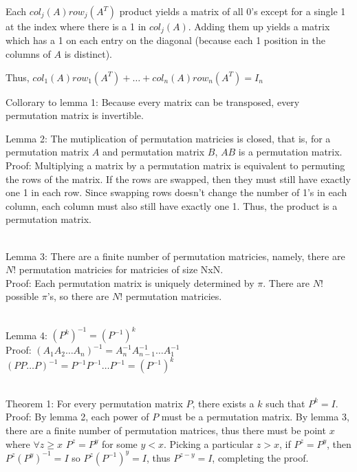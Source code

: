 \documentclass[11pt, oneside]{article}
\begin{document}
Each \( col_j(A) row_j(A^T) \) product yields a matrix of all 0's except
for a single 1 at the index where there is a 1 in \( col_j(A) \).
Adding them up yields a matrix which has a 1 on each entry on the diagonal (because each 1
position in the columns of \( A \) is distinct).

Thus, \( col_1(A) row_1(A^T) + \dots + col_n(A) row_n(A^T) = I_n \)

\noindent
Collorary to lemma 1: Because every matrix can be transposed,
every permutation matrix is invertible.

\newpage

\noindent
Lemma 2: The mutiplication of permutation matricies is closed,
that is, for a permutation matrix \( A \) and permutation matrix \( B \),
\( AB \) is a permutation matrix.
\\ Proof: Multiplying a matrix by a permutation matrix is equivalent to
permuting the rows of the matrix. If the rows are swapped, then they
must still have exactly one 1 in each row. Since swapping rows doesn't
change the number of 1's in each column, each column must also still
have exactly one 1. Thus, the product is a permutation matrix.

\noindent
\\ Lemma 3: There are a finite number of permutation matricies,
namely, there are \( N! \) permutation matricies for matricies of size NxN.
\\ Proof: Each permutation matrix is uniquely determined by \( \pi \).
There are \( N! \) possible \( \pi \)'s, so there are \( N! \) permutation matricies.

\noindent
\\ Lemma 4: \( (P^k)^{-1} = (P^{-1})^k \)
\\ Proof: \( (A_1 A_2 \dots A_n)^{-1} = A_n^{-1} A_{n - 1}^{-1} \dots A_1^{-1} \)
\\
\( (P P \dots P)^{-1} = P^{-1} P^{-1} \dots P^{-1} = (P^{-1})^k  \)

\noindent
\\ Theorem 1: For every permutation matrix \( P \), there exists a  \( k \) such that
\( P^k = I \).
\\ Proof:
By lemma 2, each power of \( P \) must be a permutation matrix.
By lemma 3, there are a finite number of permutation matrices, thus
there must be point \( x \) where \( \forall z \geq x \) \( P^z = P^y \)
for some \( y < x \). Picking a particular \( z > x \), if \( P^z = P^y \), then \( P^z (P^y)^{-1} = I \)
so \( P^z (P^{-1})^y = I \), thus \( P^{z - y} = I \), completing the proof.
\end{document}

